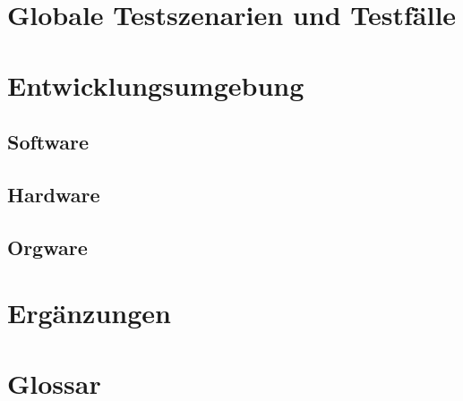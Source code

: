 \section{Globale Testszenarien und Testfälle}
\section{Entwicklungsumgebung}
\subsection{Software}
\subsection{Hardware}
\subsection{Orgware}
\section{Ergänzungen}
\section{Glossar}
